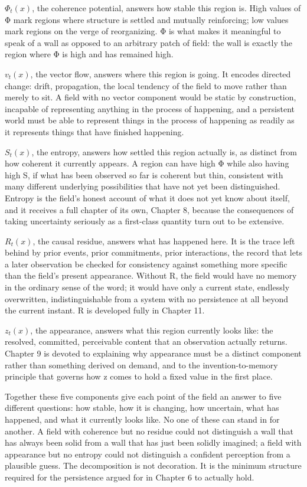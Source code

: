 \(\Phi_t(x)\), the coherence potential, answers how stable this region is. High values of Φ mark regions where structure is settled and mutually reinforcing; low values mark regions on the verge of reorganizing. Φ is what makes it meaningful to speak of a wall as opposed to an arbitrary patch of field: the wall is exactly the region where Φ is high and has remained high.

\(v_t(x)\), the vector flow, answers where this region is going. It encodes directed change: drift, propagation, the local tendency of the field to move rather than merely to sit. A field with no vector component would be static by construction, incapable of representing anything in the process of happening, and a persistent world must be able to represent things in the process of happening as readily as it represents things that have finished happening.

\(S_t(x)\), the entropy, answers how settled this region actually is, as distinct from how coherent it currently appears. A region can have high Φ while also having high S, if what has been observed so far is coherent but thin, consistent with many different underlying possibilities that have not yet been distinguished. Entropy is the field's honest account of what it does not yet know about itself, and it receives a full chapter of its own, Chapter 8, because the consequences of taking uncertainty seriously as a first-class quantity turn out to be extensive.

\(R_t(x)\), the causal residue, answers what has happened here. It is the trace left behind by prior events, prior commitments, prior interactions, the record that lets a later observation be checked for consistency against something more specific than the field's present appearance. Without R, the field would have no memory in the ordinary sense of the word; it would have only a current state, endlessly overwritten, indistinguishable from a system with no persistence at all beyond the current instant. R is developed fully in Chapter 11.

\(z_t(x)\), the appearance, answers what this region currently looks like: the resolved, committed, perceivable content that an observation actually returns. Chapter 9 is devoted to explaining why appearance must be a distinct component rather than something derived on demand, and to the invention-to-memory principle that governs how z comes to hold a fixed value in the first place.

Together these five components give each point of the field an answer to five different questions: how stable, how it is changing, how uncertain, what has happened, and what it currently looks like. No one of these can stand in for another. A field with coherence but no residue could not distinguish a wall that has always been solid from a wall that has just been solidly imagined; a field with appearance but no entropy could not distinguish a confident perception from a plausible guess. The decomposition is not decoration. It is the minimum structure required for the persistence argued for in Chapter 6 to actually hold.

